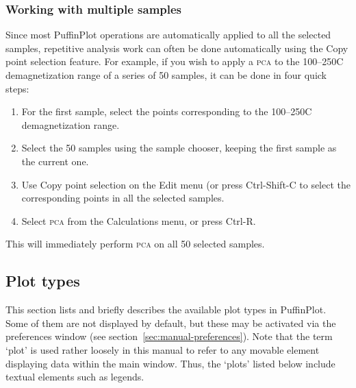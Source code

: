 \documentclass[a4paper]{article}
\newcommand{\ppcmd}[1]{\textsf{#1}} %
\newcommand{\caps}[1]{\textsc{#1}} %
\begin{document}
\subsubsection{Working with multiple samples}

Since most PuffinPlot operations are automatically applied to all the
selected samples, repetitive analysis work can often be done automatically
using the \ppcmd{Copy point selection} feature. For example, if you wish to
apply a \caps{pca} to the 100--250\textdegree{}C demagnetization range of a
series of 50 samples, it can be done in four quick steps:

\begin{enumerate}

\item For the first sample, select the points corresponding to the
  100--250\textdegree{}C demagnetization range.

\item Select the 50 samples using the sample chooser, keeping the
  first sample as the current one.

\item Use \ppcmd{Copy point selection} on the \ppcmd{Edit} menu
  (or press \ppcmd{Ctrl-Shift-C} to select the corresponding points
  in all the selected samples.

\item Select \ppcmd{\caps{pca}} from the \ppcmd{Calculations} menu,
  or press \ppcmd{Ctrl-R}.

\end{enumerate}

This will immediately perform \caps{pca} on all 50 selected samples.

\subsection{\label{sec:manual-plot-types}Plot types}

This section lists and briefly describes the available plot types in
PuffinPlot. Some of them are not displayed by default, but these may be
activated via the preferences window (see
section~\ref{sec:manual-preferences}). Note that the term `plot' is used
rather loosely in this manual to refer to any movable element displaying data
within the main window. Thus, the `plots' listed below include textual
elements such as legends.
\end{document}
